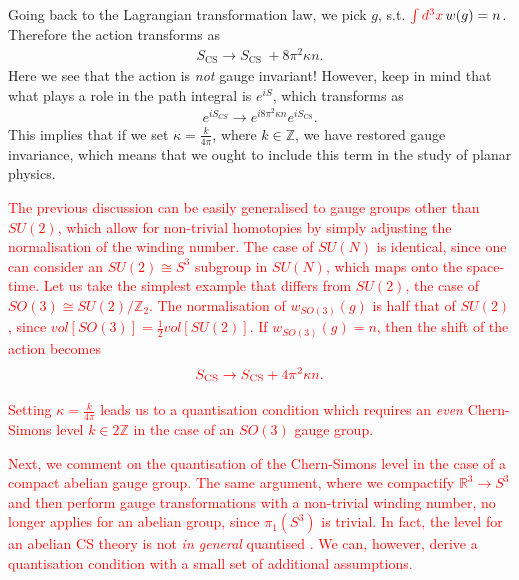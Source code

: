     Going back to the Lagrangian transformation law, we pick $g$, s.t. $\textcolor{red}{\int d^3 x} \,w(g)=n$. Therefore the action transforms as
    \begin{align}
        S_{\text{CS}} \rightarrow S_{\text{CS } }+ 8 \pi^2 \kappa n.
    \end{align}
    Here we see that the action is \textit{not} gauge invariant! However, keep in mind that what plays a role in the path integral is $e^{i S}$, which transforms as
    \begin{align}
        e^{i S_{CS}} \rightarrow e^{i 8 \pi^2 \kappa n} e^{i S_{\text{CS}}}.
    \end{align}
    This implies that if we set $\kappa = \frac{k}{4 \pi}$, where $k\in \mathbb{Z}$, we have restored gauge invariance, which means that we ought to include this term in the study of planar physics.

    \textcolor{red}{The previous discussion can be easily generali\textcolor{red}{s}ed to gauge groups other than $SU(2)$, which allow for non-trivial homotopies by simply adjusting the normali\textcolor{red}{s}ation of the winding number. The case of $SU(N)$ is identical, since one can consider an $SU(2) \cong S^3$ subgroup in $SU(N)$, which maps onto the space-time. Let us take the simplest example that differs from $SU(2)$, the case of $SO(3)\cong SU(2)/ \mathbb{Z}_2$. The normali\textcolor{red}{s}ation of $w_{SO(3)}(g)$ is half that of $SU(2)$, since $vol[SO(3)] = \frac{1}{2} vol[SU(2)]$. If $w_{SO(3)}(g)=n$, then the shift of the action becomes }
\begin{align}
    \textcolor{red}{S_{\text{CS}} \rightarrow S_{\text{CS}}+ 4\pi^2 \kappa n.}
\end{align}

\textcolor{red}{Setting $\kappa = \frac{k}{4 \pi}$ leads us to a quanti\textcolor{red}{s}ation condition which requires an \textit{even} Chern-Simons level $k \in 2\mathbb{Z}$ in the case of an $SO(3)$ gauge group.}

\textcolor{red}{Next, we comment on the quanti\textcolor{red}{s}ation of the Chern-Simons level in the case of a compact abelian gauge group. The same argument, where we compactify $\mathbb{R}^3 \rightarrow S^{3}$ and then perform gauge transformations with a non-trivial winding number, no longer applies for an abelian group, since $\pi_1(S^3)$ is trivial. In fact, the level for an abelian CS theory is not \textit{in general} quanti\textcolor{red}{s}ed \cite{Polychronakos:1990xq}. We can, however, derive a quanti\textcolor{red}{s}ation condition with a small set of additional assumptions.}

